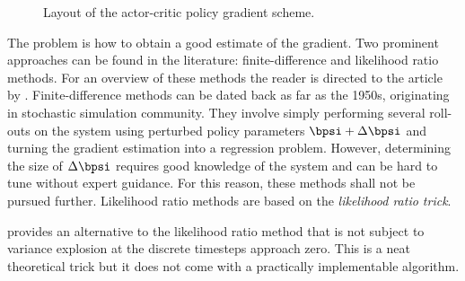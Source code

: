 \begin{figure}
\centering

\caption{Layout of the actor-critic policy gradient scheme.}
\label{figs:actorcritic}
\end{figure}

The problem is how to obtain a good estimate of the gradient. Two prominent approaches can be found in the literature: finite-difference and likelihood ratio methods. For an overview of these methods the reader is directed to the article by \cite{PS08}. Finite-difference methods can be dated back as far as the 1950s, originating in stochastic simulation community. They involve simply performing several roll-outs on the system using perturbed policy parameters $\bpsi+\Delta\bpsi$ and turning the gradient estimation into a regression problem. However, determining the size of $\Delta\bpsi$ requires good knowledge of the system and can be hard to tune without expert guidance. For this reason, these methods shall not be pursued further. Likelihood ratio methods are based on the \textit{likelihood ratio trick}.

\cite{Mun06} provides an alternative to the likelihood ratio method that is not subject to variance explosion at the discrete timesteps approach zero. This is a neat theoretical trick but it does not come with a practically implementable algorithm.


